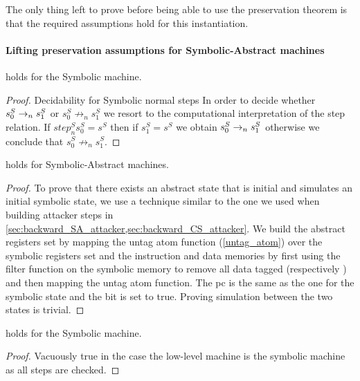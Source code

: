 The only thing left to prove before being able to use the \CFI
preservation theorem is that the required
assumptions 
hold for this instantiation.

\paragraph{Lifting preservation assumptions for Symbolic-Abstract machines}

\begin{lemma}
  \label{step_classic_symbolic}
   holds for the Symbolic machine.
\end{lemma}
\begin{proof}
  Decidability for Symbolic normal steps
  In order to decide whether $s^S_0\to_ns^S_1$ or
  $s^S_0 \not \to_n s^S_1$ we resort to the computational interpretation
  of the step relation. If $step^S_n s^S_0 = s^S$ then if
  $s^S_1 = s^S$ we obtain $s^S_0\to_ns^S_1$ otherwise
  we conclude that $s^S_0 \not \to_n s^S_1$.
\end{proof}
\begin{lemma}
  \label{initial_refine_SA}
   holds for Symbolic-Abstract machines.
\end{lemma}
\begin{proof}
  To prove that there exists an abstract
  state that is initial and simulates an initial symbolic state, we
  use a technique similar to the one we used when building attacker
  steps in \cref{sec:backward_SA_attacker,sec:backward_CS_attacker}.
  We build the abstract registers set by mapping the untag atom
  function (\cref{untag_atom}) over the symbolic registers set and the
  instruction and data memories by first using the filter function on
  the symbolic memory to remove all data tagged \DATAname
  (respectively \INSTRname) and then mapping the untag atom function.
  The pc is the same as the one for the symbolic state and the \ok bit
  is set to true. Proving simulation between the two states is trivial.
\end{proof}

\begin{lemma}
  \label{cfg_nocheck_SA}
   holds for the Symbolic machine.
\end{lemma}
\begin{proof}
  Vacuously true in the case the low-level machine is
  the symbolic machine as all steps are checked.
\end{proof}

